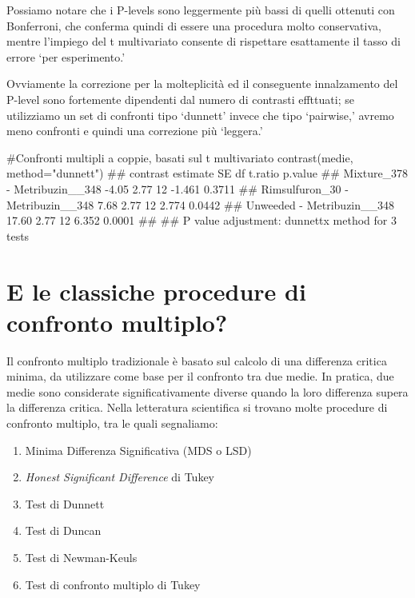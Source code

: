 \documentclass[a4paper,12pt,oneside]{book}
\providecommand{\tightlist}{%
  \setlength{\itemsep}{0pt}\setlength{\parskip}{0pt}}
\newenvironment{Shaded}{\begin{snugshade}}{\end{snugshade}}
\newcommand{\StringTok}[1]{#1}
\newcommand{\CommentTok}[1]{#1}
\newcommand{\DocumentationTok}[1]{#1}
\newcommand{\FunctionTok}[1]{#1}
\newcommand{\AttributeTok}[1]{#1}
\newcommand{\NormalTok}[1]{#1}
\begin{document}
\normalsize

Possiamo notare che i P-levels sono leggermente più bassi di quelli ottenuti con Bonferroni, che conferma quindi di essere una procedura molto conservativa, mentre l'impiego del t multivariato consente di rispettare esattamente il tasso di errore `per esperimento.'

Ovviamente la correzione per la molteplicità ed il conseguente innalzamento del P-level sono fortemente dipendenti dal numero di contrasti effttuati; se utilizziamo un set di confronti tipo `dunnett' invece che tipo `pairwise,' avremo meno confronti e quindi una correzione più `leggera.'

\begin{Shaded}
\begin{Highlighting}[]
\CommentTok{\#Confronti multipli a coppie, basati sul t multivariato}
\FunctionTok{contrast}\NormalTok{(medie, }\AttributeTok{method=}\StringTok{"dunnett"}\NormalTok{)}
\DocumentationTok{\#\#  contrast                         estimate   SE df t.ratio p.value}
\DocumentationTok{\#\#  Mixture\_378 {-} Metribuzin\_\_348       {-}4.05 2.77 12  {-}1.461  0.3711}
\DocumentationTok{\#\#  Rimsulfuron\_30 {-} Metribuzin\_\_348     7.68 2.77 12   2.774  0.0442}
\DocumentationTok{\#\#  Unweeded {-} Metribuzin\_\_348          17.60 2.77 12   6.352  0.0001}
\DocumentationTok{\#\# }
\DocumentationTok{\#\# P value adjustment: dunnettx method for 3 tests}
\end{Highlighting}
\end{Shaded}

\hypertarget{e-le-classiche-procedure-di-confronto-multiplo}{%
\section{E le classiche procedure di confronto multiplo?}\label{e-le-classiche-procedure-di-confronto-multiplo}}

Il confronto multiplo tradizionale è basato sul calcolo di una differenza critica minima, da utilizzare come base per il confronto tra due medie. In pratica, due medie sono considerate significativamente diverse quando la loro differenza supera la differenza critica. Nella letteratura scientifica si trovano molte procedure di confronto multiplo, tra le quali segnaliamo:

\begin{enumerate}
\def\labelenumi{\arabic{enumi}.}
\tightlist
\item
  Minima Differenza Significativa (MDS o LSD)
\item
  \emph{Honest Significant Difference} di Tukey
\item
  Test di Dunnett
\item
  Test di Duncan
\item
  Test di Newman-Keuls
\item
  Test di confronto multiplo di Tukey
\end{enumerate}
\end{document}
